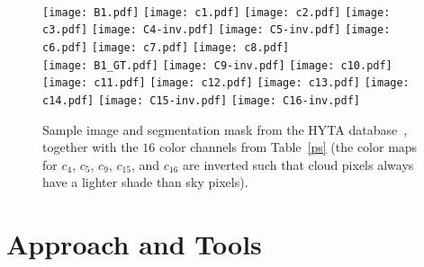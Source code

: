 \begin{figure}[htbp]
\centering
{}
\\    
\vspace{0.5mm}
\texttt{[image: B1.pdf]}
\texttt{[image: c1.pdf]}
\texttt{[image: c2.pdf]} 
\texttt{[image: c3.pdf]}   
\texttt{[image: C4-inv.pdf]}
\texttt{[image: C5-inv.pdf]}
\texttt{[image: c6.pdf]}
\texttt{[image: c7.pdf]}
\texttt{[image: c8.pdf]}\\
\vspace{1mm}
\texttt{[image: B1\_GT.pdf]}
\texttt{[image: C9-inv.pdf]}
\texttt{[image: c10.pdf]}
\texttt{[image: c11.pdf]} 
\texttt{[image: c12.pdf]}
\texttt{[image: c13.pdf]}
\texttt{[image: c14.pdf]}
\texttt{[image: C15-inv.pdf]}
\texttt{[image: C16-inv.pdf]}\\
\caption[Visual representation of $16$ color channels for a sample sky/cloud image.]{Sample image and segmentation mask from the HYTA database~\cite{Li2011}, together with the $16$ color channels from Table~\ref{ps} (the color maps for $c_4$, $c_5$, $c_9$, $c_{15}$, and $c_{16}$ are inverted such that cloud pixels always have a lighter shade than sky pixels).}
\label{fig:objective}
\end{figure}


\section{Approach and Tools}
\label{sec:approachtools}
